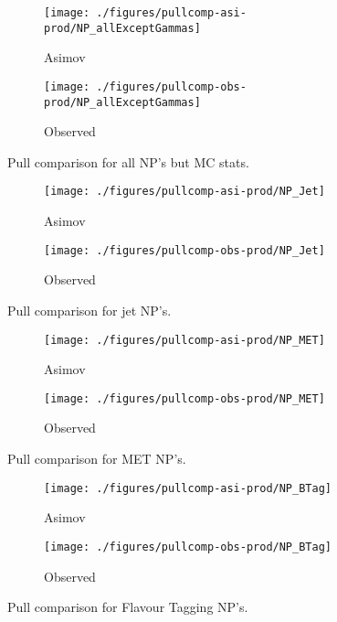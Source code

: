 \begin{figure}[!htbp]\captionsetup{justification=centering}\begin{subfigure}[t]{0.490000\textwidth}\centering\texttt{[image: ./figures/pullcomp-asi-prod/NP\_allExceptGammas]}\caption{Asimov}\end{subfigure}
\begin{subfigure}[t]{0.490000\textwidth}\centering\texttt{[image: ./figures/pullcomp-obs-prod/NP\_allExceptGammas]}\caption{Observed}\end{subfigure}
  \caption{Pull comparison for all NP's but MC stats.}
  \label{fig:PullComparisons-allExceptGammasvz}
\end{figure}

\begin{figure}[!htbp]\captionsetup{justification=centering}\begin{subfigure}[t]{0.490000\textwidth}\centering\texttt{[image: ./figures/pullcomp-asi-prod/NP\_Jet]}\caption{Asimov}\end{subfigure}
\begin{subfigure}[t]{0.490000\textwidth}\centering\texttt{[image: ./figures/pullcomp-obs-prod/NP\_Jet]}\caption{Observed}\end{subfigure}
  \caption{Pull comparison for jet NP's.}
  \label{fig:PullComparisons-Jetvz}
\end{figure}

\begin{figure}[!htbp]\captionsetup{justification=centering}\begin{subfigure}[t]{0.490000\textwidth}\centering\texttt{[image: ./figures/pullcomp-asi-prod/NP\_MET]}\caption{Asimov}\end{subfigure}
\begin{subfigure}[t]{0.490000\textwidth}\centering\texttt{[image: ./figures/pullcomp-obs-prod/NP\_MET]}\caption{Observed}\end{subfigure}
  \caption{Pull comparison for MET NP's.}
  \label{fig:PullComparisons-METvz}
\end{figure}

\begin{figure}[!htbp]\captionsetup{justification=centering}\begin{subfigure}[t]{0.490000\textwidth}\centering\texttt{[image: ./figures/pullcomp-asi-prod/NP\_BTag]}\caption{Asimov}\end{subfigure}
\begin{subfigure}[t]{0.490000\textwidth}\centering\texttt{[image: ./figures/pullcomp-obs-prod/NP\_BTag]}\caption{Observed}\end{subfigure}
  \caption{Pull comparison for Flavour Tagging NP's.}
  \label{fig:PullComparisons-BTagvz}
\end{figure}

